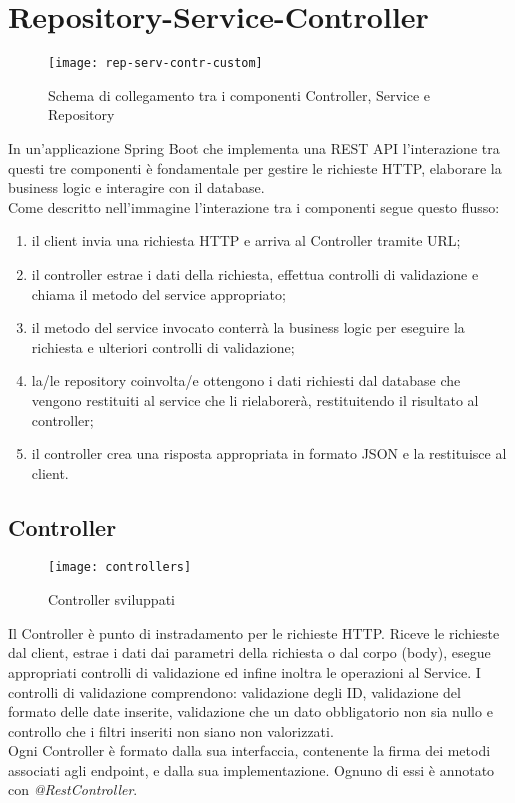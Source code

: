 \section{Repository-Service-Controller}

\begin{figure}[H] 
    \centering 
    \texttt{[image: rep-serv-contr-custom]} 
    \caption{Schema di collegamento tra i componenti Controller, Service e Repository}
\end{figure}

\noindent In un'applicazione Spring Boot che implementa una REST API l'interazione tra questi tre componenti è fondamentale per gestire le richieste HTTP, elaborare la business logic e interagire con il database.\\
Come descritto nell'immagine l'interazione tra i componenti segue questo flusso:
\begin{enumerate}
\item il client invia una richiesta HTTP e arriva al Controller tramite URL;
\item il controller estrae i dati della richiesta, effettua controlli di validazione e chiama il metodo del service appropriato;
\item il metodo del service invocato conterrà la business logic per eseguire la richiesta e ulteriori controlli di validazione;
\item la/le repository coinvolta/e ottengono i dati richiesti dal database che vengono restituiti al service che li rielaborerà, restituitendo il risultato al controller;
\item il controller crea una risposta appropriata in formato JSON e la restituisce al client.
\end{enumerate}

\subsection{Controller}
\begin{figure}[H] 
    \centering 
    \texttt{[image: controllers]} 
    \caption{Controller sviluppati}
\end{figure}
Il Controller è punto di instradamento per le richieste HTTP. Riceve le richieste dal client, estrae i dati dai parametri della richiesta o dal corpo (body), esegue appropriati controlli di validazione ed infine inoltra le operazioni al Service. I controlli di validazione comprendono: validazione degli ID, validazione del formato delle date inserite, validazione che un dato obbligatorio non sia nullo e controllo che i filtri inseriti non siano non valorizzati.\\
Ogni Controller è formato dalla sua interfaccia, contenente la firma dei metodi associati agli endpoint, e dalla sua implementazione. Ognuno di essi è annotato con \textit{@RestController}.

